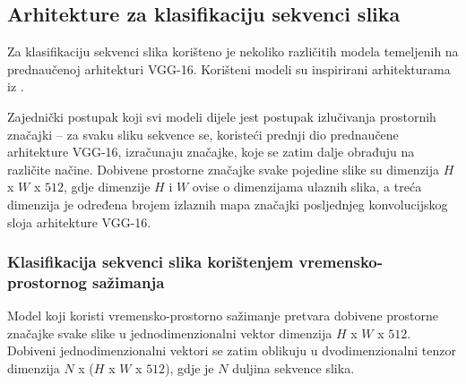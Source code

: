 \documentclass[times, utf8, diplomski, numeric]{fer}
\begin{document}
\subsection{Arhitekture za klasifikaciju sekvenci slika}
Za klasifikaciju sekvenci slika korišteno je nekoliko različitih modela temeljenih na prednaučenoj arhitekturi VGG-16. 
Korišteni modeli su inspirirani arhitekturama iz \citep{article:sequential_architectures}.

Zajednički postupak koji svi modeli dijele jest postupak izlučivanja prostornih značajki -- za svaku sliku sekvence se, koristeći prednji dio prednaučene arhitekture VGG-16, izračunaju značajke, koje se zatim dalje obrađuju na različite načine.
Dobivene prostorne značajke svake pojedine slike su dimenzija $H$ x $W$ x $512$, gdje dimenzije $H$ i $W$ ovise o dimenzijama ulaznih slika, a treća dimenzija je određena brojem izlaznih mapa značajki posljednjeg konvolucijskog sloja arhitekture VGG-16. 

\subsubsection{Klasifikacija sekvenci slika korištenjem vremensko-prostornog sažimanja}
Model koji koristi vremensko-prostorno sažimanje pretvara dobivene prostorne značajke svake slike u jednodimenzionalni vektor dimenzija $H$ x $W$ x $512$.
Dobiveni jednodimenzionalni vektori se zatim oblikuju u dvodimenzionalni tenzor dimenzija $N$ x ($H$ x $W$ x $512$), gdje je $N$ duljina sekvence slika.
\end{document}
